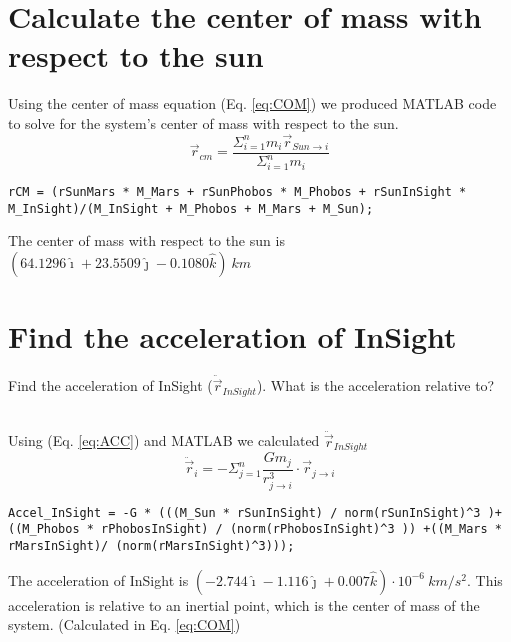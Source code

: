 \documentclass[hidelinks,12pt]{article}
\begin{document}

{\tableofcontents\let\clearpage\relax}
\clearpage
{}
\newpage
\begin{flushleft}

\section{Calculate the center of mass with respect to the sun}
Using the center of mass equation (Eq. \ref{eq:COM}) we produced MATLAB code to solve for the system's center of mass with respect to the sun.
\begin{equation} \label{eq:COM}
\vec{r}_{cm} = \frac{ \Sigma_{i=1}^{n}m_i \vec{r}_{Sun \to i} }{\Sigma_{i=1}^{n}m_i}
\end{equation}
\vspace{5px}
\begin{lstlisting}[frame=lines,style=Matlab-editor,basicstyle = \mlttfamily]
rCM = (rSunMars * M_Mars + rSunPhobos * M_Phobos + rSunInSight * M_InSight)/(M_InSight + M_Phobos + M_Mars + M_Sun);
\end{lstlisting}
\vspace{5px}
The center of mass with respect to the sun is $(64.1296 \hat{\imath} + 23.5509 \hat{\jmath} -0.1080\hat{k})~km$

\section{Find the acceleration of InSight}
\begin{large}
  Find the acceleration of InSight ($\ddot{\vec{r}}_{InSight}$). What is the acceleration relative to?
\end{large}\\
\vspace{5px}
Using (Eq. \ref{eq:ACC}) and MATLAB we calculated $\ddot{\vec{r}}_{InSight}$
\begin{equation} \label{eq:ACC}
\ddot{\vec{r}}_i = - \Sigma_{j=1}^{n} \frac{Gm_j}{r_{j \to i}^3} \cdot \vec{r}_{j \to i}
\end{equation}
\vspace{5px}
\begin{lstlisting}[frame=lines,style=Matlab-editor,basicstyle = \mlttfamily]
Accel_InSight = -G * (((M_Sun * rSunInSight) / norm(rSunInSight)^3 )+((M_Phobos * rPhobosInSight) / (norm(rPhobosInSight)^3 )) +((M_Mars * rMarsInSight)/ (norm(rMarsInSight)^3)));
\end{lstlisting}
\vspace{5px}
The acceleration of InSight is $(-2.744 \hat{\imath} -1.116 \hat{\jmath} + 0.007\hat{k}) \cdot 10^{-6}~km/s^2$. This acceleration is relative to an inertial point, which is the center of mass of the system. (Calculated in Eq. \ref{eq:COM})

\end{flushleft}
\end{document}
